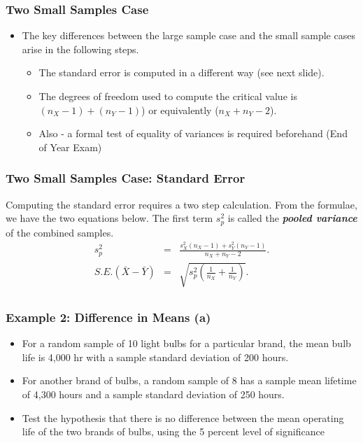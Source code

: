 \documentclass[a4]{beamer}
\begin{document}
\begin{frame}
\frametitle{Two Small Samples Case}
\begin{itemize}
\item The key differences between the large sample case and the small sample cases arise in the following steps.
    \begin{itemize}
    \item The standard error is computed in a different way (see next slide).
    \item The degrees of freedom used to compute the critical value is $(n_X-1) + (n_Y - 1)$) or equivalently ($n_X + n_Y - 2$).
    \item Also - a formal test of equality of variances is required beforehand (End of Year Exam)
    \end{itemize}
\end{itemize}
\end{frame}
\begin{frame}
\frametitle{Two Small Samples Case: Standard Error}
Computing the standard error requires a two step calculation. From the formulae, we have the two equations below. The first term $s_p^2$ is called the \textbf{\textit{pooled variance}} of the combined samples.
\begin{eqnarray*}
s_p^2&=&\frac{s_X^2(n_X-1)+s_Y^2(n_Y-1)}{n_X+n_Y-2}.\\
S.E.(\bar{X}-\bar{Y})&=&\sqrt{s_p^2\left(\frac{1}{n_X}+\frac{1}{n_Y}\right)}.\\
\end{eqnarray*}
\end{frame}


\begin{frame}
\frametitle{Example 2: Difference in Means (a) }
\begin{itemize}
\item For a random sample of 10 light bulbs for a particular brand, the mean bulb life is 4,000 hr with a sample standard deviation of 200 hours.
\item For another brand of bulbs, a random sample of 8 has a sample mean lifetime of 4,300 hours
and a sample standard deviation of 250 hours. \item Test the hypothesis that there is no difference between the
mean operating life of the two brands of bulbs, using the 5 percent level of significance
\end{itemize}
\end{frame}
\end{document}
